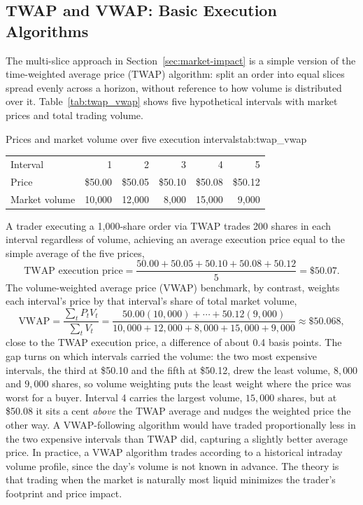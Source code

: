 \documentclass[../ai_in_finance]{subfiles}
\begin{document}
\subsection{TWAP and VWAP: Basic Execution Algorithms}
\label{sec:twap-vwap}

The multi-slice approach in Section~\ref{sec:market-impact} is a simple version of the time-weighted average price (TWAP) algorithm: split an order into equal slices spread evenly across a horizon, without reference to how volume is distributed over it. Table~\ref{tab:twap_vwap} shows five hypothetical intervals with market prices and total trading volume.

\begin{booktable}[htbp]{Prices and market volume over five execution intervals}{tab:twap_vwap}
\begin{tabular}{lrrrrr}
\toprule
Interval & 1 & 2 & 3 & 4 & 5 \\
Price & \$50.00 & \$50.05 & \$50.10 & \$50.08 & \$50.12 \\
Market volume & 10{,}000 & 12{,}000 & 8{,}000 & 15{,}000 & 9{,}000 \\
\bottomrule
\end{tabular}
\end{booktable}

A trader executing a 1,000-share order via TWAP trades 200 shares in each interval regardless of volume, achieving an average execution price equal to the simple average of the five prices,
\begin{equation*}
\text{TWAP execution price} = \frac{50.00+50.05+50.10+50.08+50.12}{5} = \$50.07.
\end{equation*}
The volume-weighted average price (VWAP) benchmark, by contrast, weights each interval's price by that interval's share of total market volume,
\begin{equation*}
\text{VWAP} = \frac{\sum_t P_t V_t}{\sum_t V_t} = \frac{50.00(10{,}000)+\cdots+50.12(9{,}000)}{10{,}000+12{,}000+8{,}000+15{,}000+9{,}000} \approx \$50.068,
\end{equation*}
close to the TWAP execution price, a difference of about 0.4 basis points. The gap turns on which intervals carried the volume: the two most expensive intervals, the third at \$50.10 and the fifth at \$50.12, drew the least volume, $8{,}000$ and $9{,}000$ shares, so volume weighting puts the least weight where the price was worst for a buyer. Interval 4 carries the largest volume, $15{,}000$ shares, but at \$50.08 it sits a cent \emph{above} the TWAP average and nudges the weighted price the other way. A VWAP-following algorithm would have traded proportionally less in the two expensive intervals than TWAP did, capturing a slightly better average price. In practice, a VWAP algorithm trades according to a historical intraday volume profile, since the day's volume is not known in advance. The theory is that trading when the market is naturally most liquid minimizes the trader's footprint and price impact.
\end{document}
